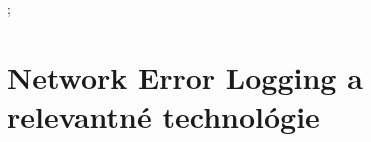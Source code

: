 ;\chapter{Network Error Logging a relevantné technológie}
\label{nel-and-related-technologies}








